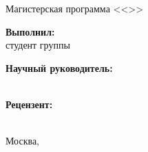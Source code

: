 \begin{titlepage}
\begin{center}

\textbf{\UniversityName}

\vspace{0.5cm}

\textbf{\FacultyName}

\vspace{0.5cm}

\textbf{\DepartmentName}

\vspace{2cm}

{\large \textbf{\WorkType}}

\vspace{0.5cm}

{\small Магистерская программа <<\MasterProgram>>}

\vspace{1cm}

{\LARGE \textbf{\WorkTitle}}

\vspace{2cm}

\end{center}

\begin{flushright}
    \begin{minipage}{0.5\textwidth}
        \begin{flushleft}
            \textbf{Выполнил:}\\
            студент группы \AuthorGroup\\
            \AuthorName

            \vspace{0.8cm}

            \textbf{Научный руководитель:}\\
            \SupervisorTitle\\
            \SupervisorName

            \vspace{0.8cm}

            \textbf{Рецензент:}\\
            \ReviewerTitle\\
            \ReviewerName
        \end{flushleft}
    \end{minipage}
\end{flushright}

\vfill

\begin{center}
    Москва, \Year
\end{center}

\end{titlepage}
